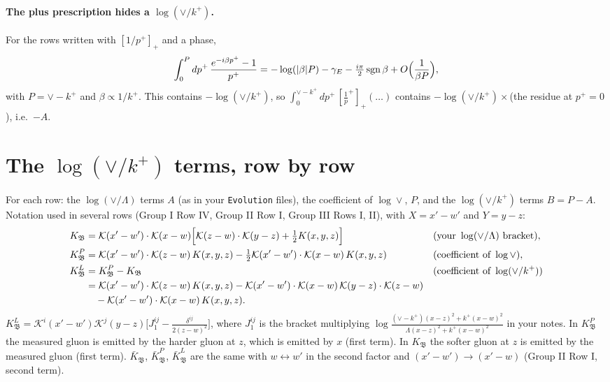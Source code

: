 \documentclass[10pt]{article}
\numberwithin{equation}{section}
\newcommand{\KK}{\mathcal K}
\newcommand{\kp}{k^+}
\newcommand{\pp}{p^+}
\begin{document}
\paragraph{The plus prescription hides a $\log(\vee/k^+)$.} For the rows written with $[1/\pp]_+$ and a phase,
\begin{equation}
\int_0^{P}d\pp\,\frac{e^{-i\beta\pp}-1}{\pp}=-\log(|\beta|P)-\gamma_E-\tfrac{i\pi}{2}\,{\rm sgn}\,\beta+O\Big(\frac{1}{\beta P}\Big),
\label{B:eq:phase}
\end{equation}
with $P=\vee-\kp$ and $\beta\propto 1/\kp$. This contains $-\log(\vee/k^+)$, so $\int_0^{\vee-\kp}d\pp\,[\frac1\pp]_+(\dots)$ contains $-\log(\vee/k^+)\times$(the residue at $\pp=0$), i.e.\ $-A$.


\section{The \texorpdfstring{$\log(\vee/k^+)$}{log(vee/k+)} terms, row by row}\label{B:sec:rows}
For each row: the $\log(\vee/\Lambda)$ terms $A$ (as in your \texttt{Evolution} files), the coefficient of $\log\vee$, $P$, and the $\log(\vee/k^+)$ terms $B=P-A$. Notation used in several rows (Group I Row IV, Group II Row I, Group III Rows I, II), with $X=x'-w'$ and $Y=y-z$:
\begin{align}
K_{\mathfrak B}&=\KK(x'-w')\cdot\KK(x-w)\Big[\KK(z-w)\cdot\KK(y-z)+\tfrac12K(x,y,z)\Big] &&(\text{your }\log(\vee/\Lambda)\text{ bracket}),\\
K^P_{\mathfrak B}&=\KK(x'-w')\cdot\KK(z-w)\,K(x,y,z)-\tfrac12\KK(x'-w')\cdot\KK(x-w)\,K(x,y,z) &&(\text{coefficient of }\log\vee),\\
K^{L}_{\mathfrak B}&=K^P_{\mathfrak B}-K_{\mathfrak B} &&(\text{coefficient of }\log(\vee/k^+))\notag\\
&=\KK(x'-w')\cdot\KK(z-w)\,K(x,y,z)-\KK(x'-w')\cdot\KK(x-w)\,\KK(y-z)\cdot\KK(z-w)\notag\\
&\quad-\KK(x'-w')\cdot\KK(x-w)\,K(x,y,z).
\end{align}
$K^{L}_{\mathfrak B}=\KK^i(x'-w')\KK^j(y-z)\big[J_1^{ij}-\frac{\delta^{ij}}{2(z-w)^2}\big]$, where $J_1^{ij}$ is the bracket multiplying $\log\frac{(\vee-k^+)(x-z)^2+k^+(x-w)^2}{\Lambda(x-z)^2+k^+(x-w)^2}$ in your notes. In $K^P_{\mathfrak B}$ the measured gluon is emitted by the harder gluon at $z$, which is emitted by $x$ (first term). In $K_{\mathfrak B}$ the softer gluon at $z$ is emitted by the measured gluon (first term). $\bar K_{\mathfrak B}$, $\bar K^P_{\mathfrak B}$, $\bar K^L_{\mathfrak B}$ are the same with $w\leftrightarrow w'$ in the second factor and $(x'-w')\to(x'-w)$ (Group II Row I, second term).
\end{document}

